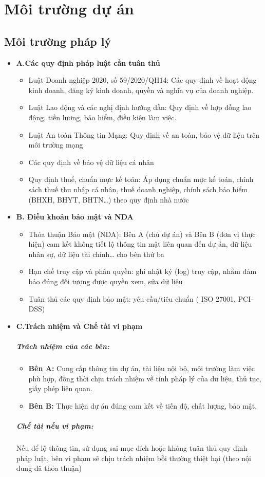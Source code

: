 \section{Môi trường dự án}
\subsection{Môi trường pháp lý}
\begin{itemize}
    \item \textbf{A.Các quy định pháp luật cần tuân thủ}
    \begin{itemize}
        \item Luật Doanh nghiệp 2020, số 59/2020/QH14: Các quy định về hoạt động kinh doanh, đăng ký kinh doanh, quyền và nghĩa vụ của doanh nghiệp.
        \item Luật Lao động và các nghị định hướng dẫn: Quy định về hợp đồng lao động, tiền lương, bảo hiểm, điều kiện làm việc.
        \item Luật An toàn Thông tin Mạng: Quy định về an toàn, bảo vệ dữ liệu trên môi trường mạng
        \item Các quy định về bảo vệ dữ liệu cá nhân
        \item Quy định thuế, chuẩn mực kế toán: Áp dụng chuẩn mực kế toán, chính sách thuế thu nhập cá nhân, thuế doanh nghiệp, chính sách bảo hiểm (BHXH, BHYT, BHTN…) theo quy định nhà nước
    \end{itemize}
    \item \textbf{B. Điều khoản bảo mật và NDA}
    \begin{itemize}
        \item Thỏa thuận Bảo mật (NDA): Bên A (chủ dự án) và Bên B (đơn vị thực hiện) cam kết không tiết lộ thông tin mật liên quan đến dự án, dữ liệu nhân sự, dữ liệu tài chính… cho bên thứ ba
        \item Hạn chế truy cập và phân quyền: ghi nhật ký (log) truy cập, nhằm đảm bảo đúng đối tượng được quyền xem, sửa dữ liệu
        \item Tuân thủ các quy định bảo mật: yêu cầu/tiêu chuẩn ( ISO 27001, PCI-DSS)
    \end{itemize}
    \item \textbf{C.Trách nhiệm và Chế tài vi phạm}
    \subparagraph{Trách nhiệm của các bên:}
    \begin{itemize}
        \item \textbf{Bên A:} Cung cấp thông tin dự án, tài liệu nội bộ, môi trường làm việc phù hợp, đồng thời chịu trách nhiệm về tính pháp lý của dữ liệu, thủ tục, giấy phép liên quan.
        \item \textbf{Bên B:} Thực hiện dự án đúng cam kết về tiến độ, chất lượng, bảo mật.
    \end{itemize}
    \subparagraph{Chế tài nếu vi phạm:}
    Nếu để lộ thông tin, sử dụng sai mục đích hoặc không tuân thủ quy định pháp luật, bên vi phạm sẽ chịu trách nhiệm bồi thường thiệt hại (theo nội dung đã thỏa thuận)
    \end{itemize}

